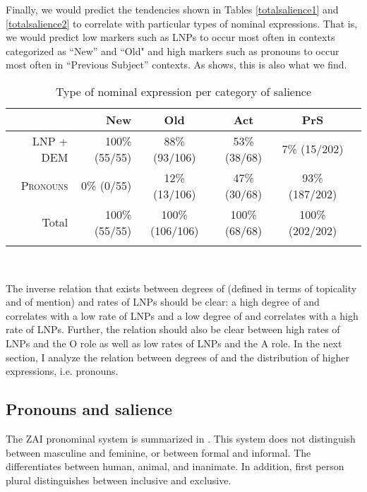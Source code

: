 Finally, we would predict the tendencies shown in Tables \ref{totalsalience1} and \ref{totalsalience2} to correlate with particular types of nominal expressions. That is, we would predict low  markers such as LNPs to occur most often in contexts categorized as ``New'' and ``Old" and high  markers such as pronouns to occur most often in ``Previous Subject'' contexts. As  shows, this is also what we find.
\begin{table}

\caption{{Type of nominal expression per category of salience}}
\begin{tabular}{ r  r  c  c  c  c }
\lsptoprule
 & New & Old & Act & PrS \\

\midrule
\textsc{LNP + DEM} &  100{\%} (55/55) &  88{\%} (93/106) & 53{\%} (38/68) & 7{\%} (15/202) \\

 
\textsc{Pronouns} & 0{\%} (0/55) & 12{\%} (13/106) & 47{\%} (30/68) & 93{\%} (187/202) \\

\midrule 
Total& 100{\%} (55/55) & 100{\%} (106/106) & 100{\%} (68/68) &100{\%} (202/202) \\

\lspbottomrule
\end{tabular}\\
\label{saliencetype}

\end{table}

The inverse relation that exists between degrees of  (defined in terms of topicality and  of mention) and rates of LNPs should be clear: a high degree of  and  correlates with a low rate of LNPs and a low degree of  and  correlates with a high rate of LNPs. Further, the relation should also be clear between high rates of LNPs and the O role as well as low rates of LNPs and the A role. In the next section, I analyze the relation between degrees of  and the distribution of higher  expressions, i.e. pronouns. 



\subsection{Pronouns and salience}\label{izpronouns}

\largerpage
The ZAI pronominal system is summarized in . This system does not distinguish between masculine and feminine, or between formal and informal. The  differentiates between human, animal, and inanimate. In addition, first person plural distinguishes between inclusive and exclusive.

